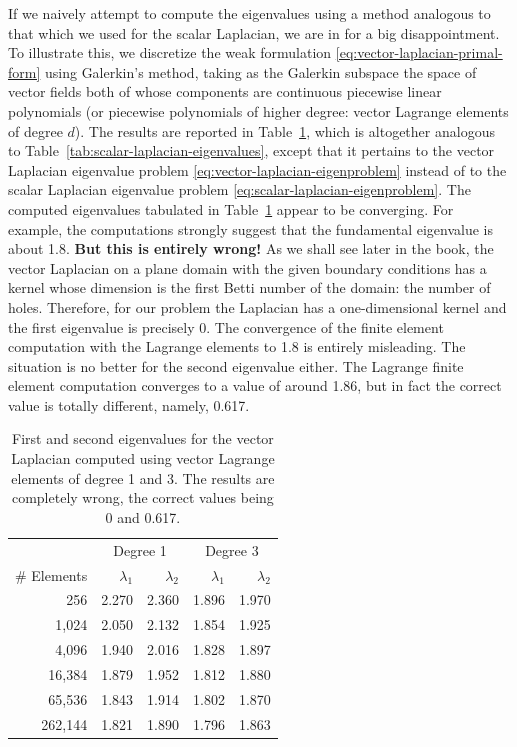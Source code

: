 {If we naively attempt to compute the eigenvalues using a method analogous to that which we used for the scalar Laplacian, we are in for a big disappointment. To illustrate this, we discretize the weak formulation \eqref{eq:vector-laplacian-primal-form} using Galerkin's method, taking as the Galerkin subspace the space of vector fields both of whose components are continuous piecewise linear polynomials (or piecewise polynomials of higher degree: vector Lagrange elements of degree $d$). The results are reported in Table~\ref{tab:vector-lagrange-wrong-eigenvalues}, which is altogether analogous to Table~\ref{tab:scalar-laplacian-eigenvalues}, except that it pertains to the vector Laplacian eigenvalue problem \eqref{eq:vector-laplacian-eigenproblem} instead of to the scalar Laplacian eigenvalue problem \eqref{eq:scalar-laplacian-eigenproblem}. The computed eigenvalues tabulated in Table~\ref{tab:vector-lagrange-wrong-eigenvalues} appear to be converging. For example, the computations strongly suggest that the fundamental eigenvalue is about 1.8. \textbf{But this is entirely wrong!} As we shall see later in the book, the vector Laplacian on a plane domain with the given boundary conditions has a kernel whose dimension is the first Betti number of the domain: the number of holes. Therefore, for our problem the Laplacian has a one-dimensional kernel and the first eigenvalue is precisely 0. The convergence of the finite element computation with the Lagrange elements to 1.8 is entirely misleading. The situation is no better for the second eigenvalue either. The Lagrange finite element computation converges to a value of around 1.86, but in fact the correct value is totally different, namely, 0.617.}

\begin{table}[H]\centering
\caption{{First and second eigenvalues for the vector Laplacian computed using vector Lagrange elements of degree 1 and 3. The results are completely wrong, the correct values being 0 and 0.617.}}\label{tab:vector-lagrange-wrong-eigenvalues}
\begin{tabular}{r|rr|rr}\hline
&\multicolumn{2}{c|}{{Degree 1}}&\multicolumn{2}{c}{{Degree 3}}\\
{\# Elements}&$\lambda_1$&$\lambda_2$&$\lambda_1$&$\lambda_2$\\\hline
256&2.270&2.360&1.896&1.970\\
1,024&2.050&2.132&1.854&1.925\\
4,096&1.940&2.016&1.828&1.897\\
16,384&1.879&1.952&1.812&1.880\\
65,536&1.843&1.914&1.802&1.870\\
262,144&1.821&1.890&1.796&1.863\\\hline
\end{tabular}
\end{table}

